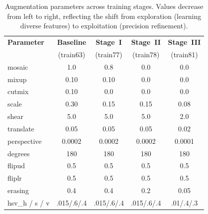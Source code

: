 \documentclass[11pt, a4paper]{article}
\begin{document}
\begin{table}[h]
  \centering
  \caption{Augmentation parameters across training stages.  Values
    decrease from left to right, reflecting the shift from exploration
    (learning diverse features) to exploitation (precision refinement).}
  \label{tab:augmentation}
  \small
  \begin{tabular}{@{}lcccc@{}}
    \toprule
    \textbf{Parameter} & \textbf{Baseline} & \textbf{Stage~I} & \textbf{Stage~II} & \textbf{Stage~III} \\
                       & (train63)         & (train77)        & (train78)         & (train81)          \\
    \midrule
    mosaic             & 1.0               & 0.8              & 0.0               & 0.0                \\
    mixup              & 0.10              & 0.10             & 0.0               & 0.0                \\
    cutmix             & 0.10              & 0.0              & 0.0               & 0.0                \\
    scale              & 0.30              & 0.15             & 0.15              & 0.08               \\
    shear              & 5.0               & 5.0              & 5.0               & 2.0                \\
    translate          & 0.05              & 0.05             & 0.05              & 0.02               \\
    perspective        & 0.0002            & 0.0002           & 0.0002            & 0.0001             \\
    degrees            & 180               & 180              & 180               & 180                \\
    flipud             & 0.5               & 0.5              & 0.5               & 0.5                \\
    fliplr             & 0.5               & 0.5              & 0.5               & 0.5                \\
    erasing            & 0.4               & 0.4              & 0.2               & 0.05               \\
    hsv\_h / s / v     & .015/.6/.4        & .015/.6/.4       & .015/.6/.4        & .01/.4/.3          \\
    \bottomrule
  \end{tabular}
\end{table}
\end{document}
